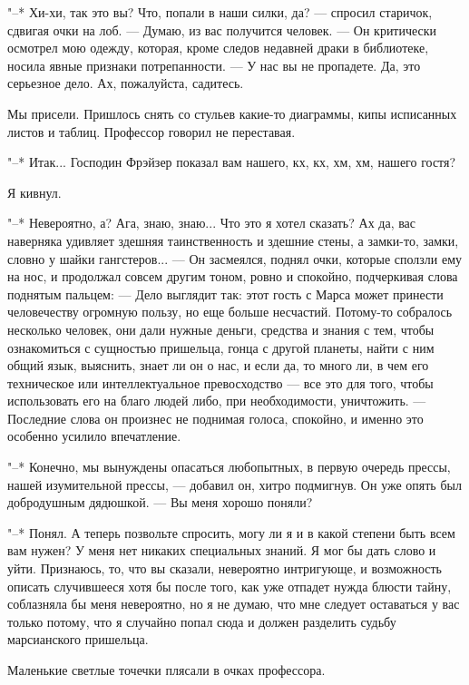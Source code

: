 "--* Хи-хи, так это вы? Что, попали в наши силки, да? --- спросил  старичок,
сдвигая очки на лоб. --- Думаю, из вас получится человек.  ---  Он  критически
осмотрел мою одежду, которая, кроме следов недавней  драки  в  библиотеке,
носила явные признаки потрепанности. --- У нас  вы  не  пропадете.  Да,  это
серьезное дело. Ах, пожалуйста, садитесь.

Мы  присели.  Пришлось  снять  со  стульев  какие-то  диаграммы,   кипы
исписанных листов и таблиц. Профессор говорил не переставая.

"--* Итак... Господин Фрэйзер показал вам нашего, кх, кх, хм,  хм,  нашего
гостя?

Я кивнул.

"--* Невероятно, а? Ага, знаю, знаю... Что это я хотел сказать? Ах да, вас
наверняка удивляет здешняя таинственность и  здешние  стены,  а  замки-то,
замки, словно у шайки гангстеров... --- Он засмеялся, поднял  очки,  которые
сползли ему на нос, и продолжал совсем другим  тоном,  ровно  и  спокойно,
подчеркивая слова поднятым пальцем: --- Дело  выглядит  так:  этот  гость  с
Марса  может  принести  человечеству  огромную  пользу,  но   еще   больше
несчастий. Потому-то собралось несколько человек, они дали нужные  деньги,
средства и знания с тем, чтобы ознакомиться с сущностью пришельца, гонца с
другой планеты, найти с ним общий язык, выяснить, знает ли  он  о  нас,  и
если  да,  то  много  ли,  в  чем  его  техническое  или  интеллектуальное
превосходство --- все это для того, чтобы использовать его  на  благо  людей
либо, при необходимости, уничтожить. ---  Последние  слова  он  произнес  не
поднимая голоса, спокойно, и именно это особенно усилило впечатление.

"--* Конечно, мы вынуждены опасаться любопытных, в первую очередь  прессы,
нашей изумительной прессы, --- добавил он, хитро подмигнув. Он уже опять был
добродушным дядюшкой. --- Вы меня хорошо поняли?

"--* Понял. А теперь позвольте спросить, могу ли я и в какой степени  быть
всем вам нужен? У меня нет никаких специальных знаний. Я мог бы дать слово
и  уйти.  Признаюсь,  то,  что  вы  сказали,  невероятно   интригующе,   и
возможность описать случившееся хотя бы после того, как уже отпадет  нужда
блюсти тайну, соблазняла бы меня  невероятно,  но  я  не  думаю,  что  мне
следует оставаться у вас только потому, что я случайно попал сюда и должен
разделить судьбу марсианского пришельца.

Маленькие светлые точечки плясали в очках профессора.

